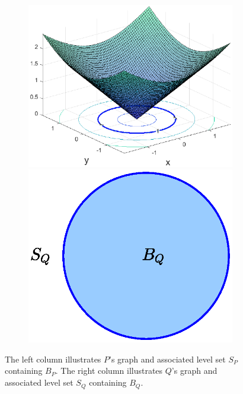 \documentclass[11pt]{article}
\newenvironment{example}
  {\pushQED{\qed}\renewcommand{\qedsymbol}{$\triangle$}\examplex}
  {\popQED\endexamplex}
\theoremstyle{remark}
\begin{document}
\begin{example}
\begin{figure}[!htb]
\begin{subfigure}{0.5\textwidth}
    \includegraphics[scale=0.6]{Fig2c.eps}
    \vspace{-10pt}
    \includegraphics[scale=0.6]{Fig2d.eps}
    \end{subfigure}
    \caption{The left column illustrates $P$'s graph and associated level set $S_P$ containing $B_P$. The right column illustrates $Q$'s graph and associated level set $S_Q$ containing $B_Q$.}
    \label{fig:Weierstrass}
\end{figure}
\end{example}
\end{document}

